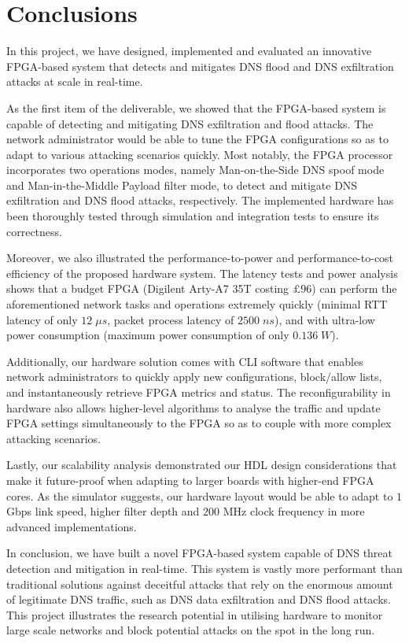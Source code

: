 \documentclass[a4paper]{report}
\begin{document}
\section{Conclusions}
In this project, we have designed, implemented and evaluated an innovative FPGA-based system that detects and mitigates DNS flood and DNS exfiltration attacks at scale in real-time.

As the first item of the deliverable, we showed that the FPGA-based system is capable of detecting and mitigating DNS exfiltration and flood attacks. The network administrator would be able to tune the FPGA configurations so as to adapt to various attacking scenarios quickly. Most notably, the FPGA processor incorporates two operations modes, namely Man-on-the-Side DNS spoof mode and Man-in-the-Middle Payload filter mode, to detect and mitigate DNS exfiltration and DNS flood attacks, respectively. The implemented hardware has been thoroughly tested through simulation and integration tests to ensure its correctness.

Moreover, we also illustrated the performance-to-power and performance-to-cost efficiency of the proposed hardware system. The latency tests and power analysis shows that a budget FPGA (Digilent Arty-A7 35T costing $£96$) can perform the aforementioned network tasks and operations extremely quickly (minimal RTT latency of only $12\; \mu s$, packet process latency of $2500\; ns$), and with ultra-low power consumption (maximum power consumption of only $0.136\; W$). 

Additionally, our hardware solution comes with CLI software that enables network administrators to quickly apply new configurations, block/allow lists, and instantaneously retrieve FPGA metrics and status. The reconfigurability in hardware also allows higher-level algorithms to analyse the traffic and update FPGA settings simultaneously to the FPGA so as to couple with more complex attacking scenarios.

Lastly, our scalability analysis demonstrated our HDL design considerations that make it future-proof when adapting to larger boards with higher-end FPGA cores. As the simulator suggests, our hardware layout would be able to adapt to $1$ Gbps link speed, higher filter depth and $200$ MHz clock frequency in more advanced implementations.

In conclusion, we have built a novel FPGA-based system capable of DNS threat detection and mitigation in real-time. This system is vastly more performant than traditional solutions against deceitful attacks that rely on the enormous amount of legitimate DNS traffic, such as DNS data exfiltration and DNS flood attacks. This project illustrates the research potential in utilising hardware to monitor large scale networks and block potential attacks on the spot in the long run.
\end{document}
